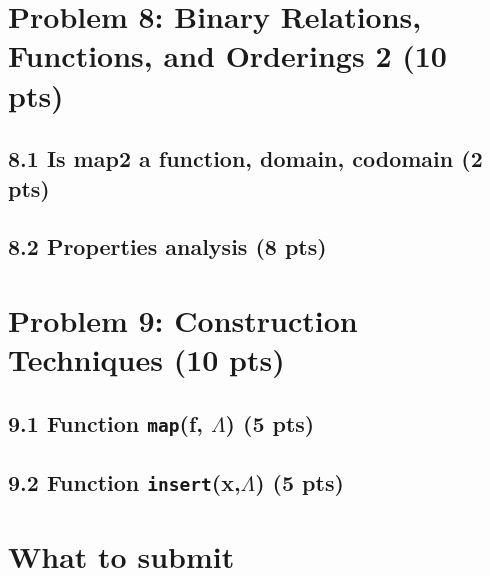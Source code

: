 \documentclass[11pt]{article}
\begin{document}
\newpage
\section{Problem 8: Binary Relations, Functions, and Orderings 2 (10 pts)}

\subsection*{8.1 Is map2 a function, domain, codomain (2 pts)}

\subsection*{8.2 Properties analysis (8 pts)}

\newpage
\section{Problem 9: Construction Techniques (10 pts)}

\subsection*{9.1 Function \texttt{map}(f, \(\Lambda\)) (5 pts)}

\subsection*{9.2 Function \texttt{insert}(x,\(\Lambda\)) (5 pts)}

\newpage
\section*{What to submit}
\end{document}
